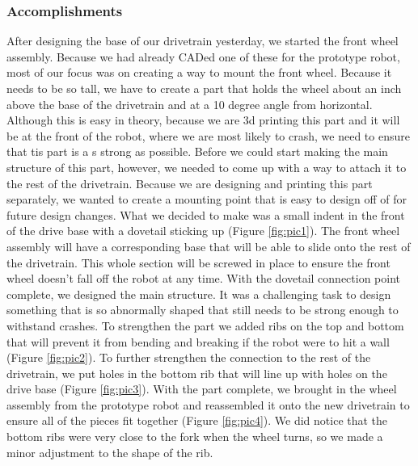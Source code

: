 \subsubsection*{Accomplishments}
After designing the base of our drivetrain yesterday, we started the front wheel assembly. Because we had already CADed one of these for the prototype robot, most of our focus was on creating a way to mount the front wheel. Because it needs to be so tall, we have to create a part that holds the wheel about an inch above the base of the drivetrain and at a 10 degree angle from horizontal. Although this is easy in theory, because we are 3d printing this part and it will be at the front of the robot, where we are most likely to crash, we need to ensure that tis part is a s strong as possible. Before we could start making the main structure of this part, however, we needed to come up with a way to attach it to the rest of the drivetrain. Because we are designing and printing this part separately, we wanted to create a mounting point that is easy to design off of for future design changes. What we decided to make was a small indent in the front of the drive base with a dovetail sticking up (Figure \ref{fig:pic1}). The front wheel assembly will have a corresponding base that will be able to slide onto the rest of the drivetrain. This whole section will be screwed in place to ensure the front wheel doesn't fall off the robot at any time. 
With the dovetail connection point complete, we designed the main structure. It was a challenging task to design something that is so abnormally shaped that still needs to be strong enough to withstand crashes. To strengthen the part we added ribs on the top and bottom that will prevent it from bending and breaking if the robot were to hit a wall (Figure \ref{fig:pic2}). To further strengthen the connection to the rest of the drivetrain, we put holes in the bottom rib that will line up with holes on the drive base (Figure \ref{fig:pic3}). With the part complete, we brought in the wheel assembly from the prototype robot and reassembled it onto the new drivetrain to ensure all of the pieces fit together (Figure \ref{fig:pic4}). We did notice that the bottom ribs were very close to the fork when the wheel turns, so we made a minor adjustment to the shape of the rib.

 

